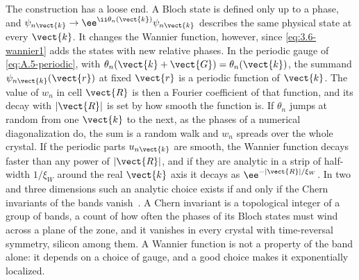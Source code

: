 The construction has a loose end. A Bloch state is defined only up to a phase, and $\psi_{n\vect{k}} \to \ee^{\ii\theta_n(\vect{k})}\psi_{n\vect{k}}$ describes the same physical state at every $\vect{k}$. It changes the Wannier function, however, since \cref{eq:3.6-wannier1} adds the states with new relative phases. In the periodic gauge of \cref{eq:A.5-periodic}, with $\theta_n(\vect{k} + \vect{G}) = \theta_n(\vect{k})$, the summand $\psi_{n\vect{k}}(\vect{r})$ at fixed $\vect{r}$ is a periodic function of $\vect{k}$. The value of $w_n$ in cell $\vect{R}$ is then a Fourier coefficient of that function, and its decay with $|\vect{R}|$ is set by how smooth the function is. If $\theta_n$ jumps at random from one $\vect{k}$ to the next, as the phases of a numerical diagonalization do, the sum is a random walk and $w_n$ spreads over the whole crystal. If the periodic parts $u_{n\vect{k}}$ are smooth, the Wannier function decays faster than any power of $|\vect{R}|$, and if they are analytic in a strip of half-width $1/\xi_W$ around the real $\vect{k}$ axis it decays as $\ee^{-|\vect{R}|/\xi_W}$. In two and three dimensions such an analytic choice exists if and only if the Chern invariants of the bands vanish~\cite{brouder2007exponential}. A Chern invariant is a topological integer of a group of bands, a count of how often the phases of its Bloch states must wind across a plane of the zone, and it vanishes in every crystal with time-reversal symmetry, silicon among them. A Wannier function is not a property of the band alone: it depends on a choice of gauge, and a good choice makes it exponentially localized.


